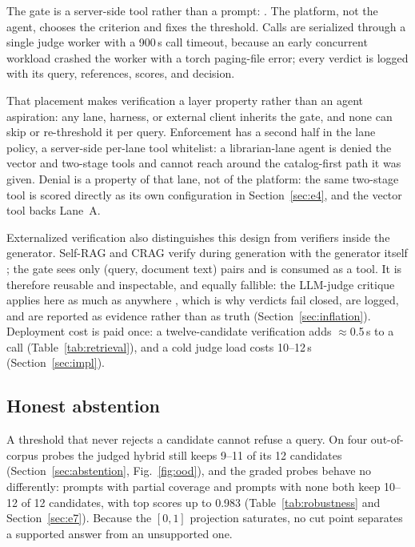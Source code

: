 The gate is a server-side tool rather than a prompt:
. The platform, not the agent, chooses the criterion
and fixes the threshold. Calls are serialized through a single judge worker with
a 900\,s call timeout, because an early concurrent workload crashed the worker
with a torch paging-file error; every verdict is logged with its query,
references, scores, and decision.

That placement makes verification a layer property rather than an agent
aspiration: any lane, harness, or external client inherits the gate, and none can
skip or re-threshold it per query. Enforcement has a second half in the lane
policy, a server-side per-lane tool whitelist: a librarian-lane agent is denied
the vector and two-stage tools and cannot reach around the catalog-first path it
was given. Denial is a property of that lane, not of the platform: the same
two-stage tool is scored directly as its own configuration in
Section~\ref{sec:e4}, and the vector tool backs Lane~A.

Externalized verification also distinguishes this design from verifiers inside
the generator. Self-RAG and CRAG verify during generation with the generator
itself \cite{selfrag,crag}; the gate sees only (query, document text) pairs and
is consumed as a tool. It is therefore reusable and inspectable, and equally
fallible: the LLM-judge critique applies here as much as anywhere
\cite{zheng-llmjudge}, which is why verdicts fail closed, are logged, and are
reported as evidence rather than as truth (Section~\ref{sec:inflation}). Deployment
cost is paid once: a twelve-candidate verification adds $\approx$0.5\,s to a call
(Table~\ref{tab:retrieval}), and a cold judge load costs 10--12\,s
(Section~\ref{sec:impl}).

\subsection{Honest abstention}

A threshold that never rejects a candidate cannot refuse a query. On four
out-of-corpus probes the judged hybrid still keeps 9--11 of its 12 candidates
(Section~\ref{sec:abstention}, Fig.~\ref{fig:ood}), and the graded probes behave
no differently: prompts with partial coverage and prompts with none both keep
10--12 of 12 candidates, with top scores up to 0.983
(Table~\ref{tab:robustness} and Section~\ref{sec:e7}). Because the $[0,1]$
projection saturates, no cut point separates a supported answer from an
unsupported one.

